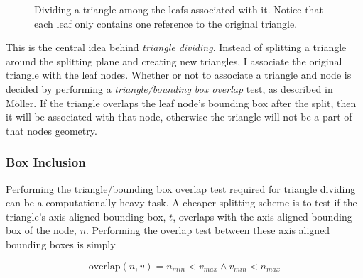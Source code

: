 \begin{figure}
  \centering
  
  \vspace{3mm}
  \parbox{5cm}{\caption[Dividing a triangle.]{Dividing a triangle among the
      leafs associated with it. Notice that each leaf only contains one
      reference to the original triangle.}\label{fig:dividing}}
\end{figure}

This is the central idea behind \textit{triangle dividing}. Instead of splitting
a triangle around the splitting plane and creating new triangles, I associate
the original triangle with the leaf nodes. Whether or not to associate a
triangle and node is decided by performing a \textit{triangle/bounding box
  overlap} test, as described in Möller. If the triangle
overlaps the leaf node's bounding box after the split, then it will be
associated with that node, otherwise the triangle will not be a part of that
nodes geometry.


\subsubsection{Box Inclusion}\label{sec:boxInclusion}


Performing the triangle/bounding box overlap test required for triangle dividing
can be a computationally heavy task. A cheaper splitting scheme is to test if
the triangle's axis aligned bounding box, $t$, overlaps with the axis aligned
bounding box of the node, $n$. Performing the overlap test between these axis
aligned bounding boxes is simply

\begin{displaymath}
  \text{overlap}(n,v) = n_{min} < v_{max} \wedge v_{min} < n_{max}
\end{displaymath}


